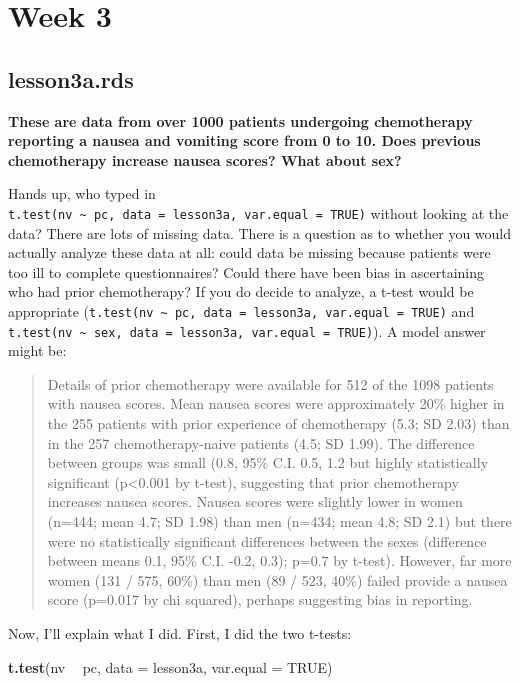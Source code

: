 \documentclass[]{book}
\newenvironment{Shaded}{\begin{snugshade}}{\end{snugshade}}
\newcommand{\DataTypeTok}[1]{\textcolor[rgb]{0.13,0.29,0.53}{#1}}
\newcommand{\KeywordTok}[1]{\textcolor[rgb]{0.13,0.29,0.53}{\textbf{#1}}}
\newcommand{\NormalTok}[1]{#1}
\newcommand{\OperatorTok}[1]{\textcolor[rgb]{0.81,0.36,0.00}{\textbf{#1}}}
\newcommand{\OtherTok}[1]{\textcolor[rgb]{0.56,0.35,0.01}{#1}}
\newcommand{\StringTok}[1]{\textcolor[rgb]{0.31,0.60,0.02}{#1}}
\begin{document}
\hypertarget{week-3-1}{%
\section{Week 3}\label{week-3-1}}

\hypertarget{lesson3a.rds}{%
\subsection{lesson3a.rds}\label{lesson3a.rds}}

\textbf{These are data from over 1000 patients undergoing chemotherapy
reporting a nausea and vomiting score from 0 to 10. Does previous
chemotherapy increase nausea scores? What about sex?}

Hands up, who typed in
\texttt{t.test(nv\ \textasciitilde{}\ pc,\ data\ =\ lesson3a,\ var.equal\ =\ TRUE)}
without looking at the data? There are lots of missing data. There is a
question as to whether you would actually analyze these data at all:
could data be missing because patients were too ill to complete
questionnaires? Could there have been bias in ascertaining who had prior
chemotherapy? If you do decide to analyze, a t-test would be appropriate
(\texttt{t.test(nv\ \textasciitilde{}\ pc,\ data\ =\ lesson3a,\ var.equal\ =\ TRUE)}
and
\texttt{t.test(nv\ \textasciitilde{}\ sex,\ data\ =\ lesson3a,\ var.equal\ =\ TRUE)}).
A model answer might be:

\begin{quote}
Details of prior chemotherapy were available for 512 of the 1098
patients with nausea scores. Mean nausea scores were approximately 20\%
higher in the 255 patients with prior experience of chemotherapy (5.3;
SD 2.03) than in the 257 chemotherapy-naive patients (4.5; SD 1.99). The
difference between groups was small (0.8, 95\% C.I. 0.5, 1.2 but highly
statistically significant (p\textless0.001 by t-test), suggesting that
prior chemotherapy increases nausea scores. Nausea scores were slightly
lower in women (n=444; mean 4.7; SD 1.98) than men (n=434; mean 4.8; SD
2.1) but there were no statistically significant differences between the
sexes (difference between means 0.1, 95\% C.I. -0.2, 0.3); p=0.7 by
t-test). However, far more women (131 / 575, 60\%) than men (89 / 523,
40\%) failed provide a nausea score (p=0.017 by chi squared), perhaps
suggesting bias in reporting.
\end{quote}

Now, I'll explain what I did. First, I did the two t-tests:

\begin{Shaded}
\begin{Highlighting}[]
\KeywordTok{t.test}\NormalTok{(nv }\OperatorTok{~}\StringTok{ }\NormalTok{pc, }\DataTypeTok{data =}\NormalTok{ lesson3a, }\DataTypeTok{var.equal =} \OtherTok{TRUE}\NormalTok{)}
\end{Highlighting}
\end{Shaded}
\end{document}
